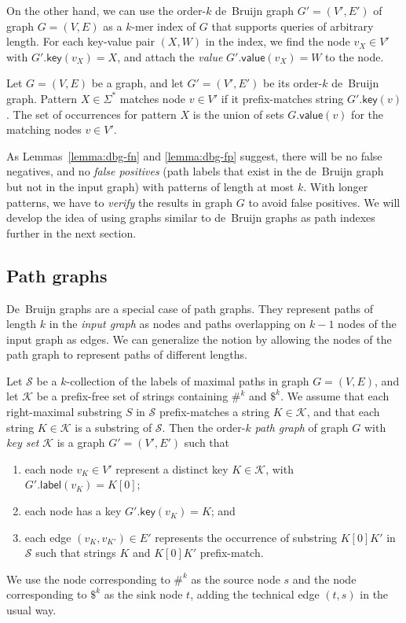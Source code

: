 \documentclass[a4paper,UKenglish]{lipics-v2016}
\newcommand{\glabel}{\ensuremath{\mathsf{label}}}
\newcommand{\gkey}{\ensuremath{\mathsf{key}}}
\newcommand{\gvalue}{\ensuremath{\mathsf{value}}}
\newcommand{\kmer}[1]{$#1$\nobreakdash-mer}
\newcommand{\kcollection}[1]{$#1$\nobreakdash-collection}
\newcommand{\orderk}[1]{order\nobreakdash-$#1$}
\begin{document}
On the other hand, we can use the \orderk{k} de~Bruijn graph $G' = (V', E')$ of graph $G = (V, E)$ as a \kmer{k} index of $G$ that supports queries of arbitrary length. For each key-value pair $(X, W)$ in the index, we find the node $v_{X} \in V'$ with $G'.\gkey(v_{X}) = X$, and attach the \emph{value} $G'.\gvalue(v_{X}) = W$ to the node.

\begin{definition}
Let $G = (V, E)$ be a graph, and let $G' = (V', E')$ be its \orderk{k} de~Bruijn graph. Pattern $X \in \Sigma^{\ast}$ matches node $v \in V'$ if it prefix-matches string $G'.\gkey(v)$. The set of occurrences for pattern $X$ is the union of sets $G.\gvalue(v)$ for the matching nodes $v \in V'$.
\end{definition}

As Lemmas~\ref{lemma:dbg-fn} and \ref{lemma:dbg-fp} suggest, there will be no false negatives, and no \emph{false positives} (path labels that exist in the de~Bruijn graph but not in the input graph) with patterns of length at most $k$. With longer patterns, we have to \emph{verify} the results in graph $G$ to avoid false positives. We will develop the idea of using graphs similar to de~Bruijn graphs as path indexes further in the next section.

\subsection{Path graphs}

De~Bruijn graphs are a special case of path graphs. They represent paths of length $k$ in the \emph{input graph} as nodes and paths overlapping on $k-1$ nodes of the input graph as edges. We can generalize the notion by allowing the nodes of the path graph to represent paths of different lengths.

\begin{definition}
Let $\mathcal{S}$ be a \kcollection{k} of the labels of maximal paths in graph $G = (V, E)$, and let $\mathcal{K}$ be a prefix-free set of strings containing $\#^{k}$ and $\$^{k}$. We assume that each right-maximal substring $S$ in $\mathcal{S}$ prefix-matches a string $K \in \mathcal{K}$, and that each string $K \in \mathcal{K}$ is a substring of $\mathcal{S}$. Then the \orderk{k} \emph{path graph} of graph $G$ with \emph{key set} $\mathcal{K}$ is a graph $G' = (V', E')$ such that
\begin{enumerate}
\item each node $v_{K} \in V'$ represent a distinct key $K \in \mathcal{K}$, with $G'.\glabel(v_{K}) = K[0]$;
\item each node has a key $G'.\gkey(v_{K}) = K$; and
\item each edge $(v_{K}, v_{K'}) \in E'$ represents the occurrence of substring $K[0] K'$ in $\mathcal{S}$ such that strings $K$ and $K[0] K'$ prefix-match.
\end{enumerate}
We use the node corresponding to $\#^{k}$ as the source node $s$ and the node corresponding to $\$^{k}$ as the sink node $t$, adding the technical edge $(t, s)$ in the usual way.
\end{definition}
\end{document}
